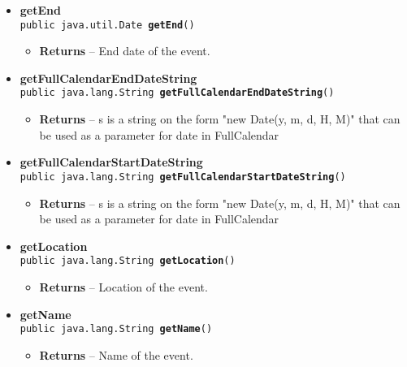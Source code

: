 \documentclass[11pt,a4paper]{report}
\begin{document}
{{{\begin{itemize}
{}%
\item{ 
{\bf  getEnd}\\
\texttt{public java.util.Date\ {\bf  getEnd}()
\label{is.mpg.ruglan.data.CalEvent.getEnd()}}%
\begin{itemize}
\item{{\bf  Returns} -- 
End date of the event. 
}%
\end{itemize}
}%
\item{ 
{\bf  getFullCalendarEndDateString}\\
\texttt{public java.lang.String\ {\bf  getFullCalendarEndDateString}()
\label{is.mpg.ruglan.data.CalEvent.getFullCalendarEndDateString()}}%
\begin{itemize}
\item{{\bf  Returns} -- 
s is a string on the form "new Date(y, m, d, H, M)" that can be used as a parameter for date in FullCalendar 
}%
\end{itemize}
}%
\item{ 
{\bf  getFullCalendarStartDateString}\\
\texttt{public java.lang.String\ {\bf  getFullCalendarStartDateString}()
\label{is.mpg.ruglan.data.CalEvent.getFullCalendarStartDateString()}}%
\begin{itemize}
\item{{\bf  Returns} -- 
s is a string on the form "new Date(y, m, d, H, M)" that can be used as a parameter for date in FullCalendar 
}%
\end{itemize}
}%
\item{ 
{\bf  getLocation}\\
\texttt{public java.lang.String\ {\bf  getLocation}()
\label{is.mpg.ruglan.data.CalEvent.getLocation()}}%
\begin{itemize}
\item{{\bf  Returns} -- 
Location of the event. 
}%
\end{itemize}
}%
\item{ 
{\bf  getName}\\
\texttt{public java.lang.String\ {\bf  getName}()
\label{is.mpg.ruglan.data.CalEvent.getName()}}%
\begin{itemize}
\item{{\bf  Returns} -- 
Name of the event. 
}%
\end{itemize}
}
\end{itemize}}}}
\end{document}
